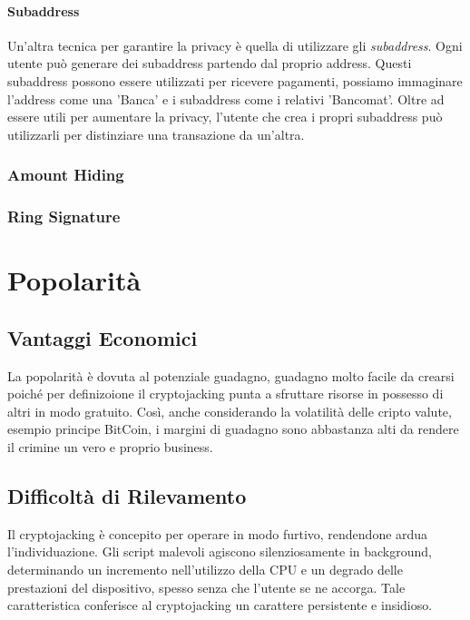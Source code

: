 \documentclass[12pt,a4paper]{article}
\begin{document}
\paragraph{Subaddress}
Un'altra tecnica per garantire la privacy è quella di utilizzare gli
\textit{subaddress}. Ogni utente può generare dei subaddress partendo dal
proprio address. Questi subaddress possono essere utilizzati per ricevere
pagamenti, possiamo immaginare l'address come una 'Banca' e i subaddress come i
relativi 'Bancomat'. Oltre ad essere utili per aumentare la privacy, l'utente
che crea i propri subaddress può utilizzarli per distinziare una transazione da
un'altra.

\subsubsection{Amount Hiding}

\subsubsection{Ring Signature}

\newpage 

\section{Popolarità}

\subsection{Vantaggi Economici}
La popolarità è dovuta al potenziale guadagno, guadagno molto facile da crearsi
poiché per definizoione il cryptojacking punta a sfruttare risorse in possesso
di altri in modo gratuito. Così, anche considerando la volatilità delle cripto
valute, esempio principe BitCoin, i margini di guadagno sono abbastanza alti da
rendere il crimine un vero e proprio business. 

\subsection{Difficoltà di Rilevamento}
Il cryptojacking è concepito per operare in modo furtivo, rendendone ardua
l'individuazione. Gli script malevoli agiscono silenziosamente in background,
determinando un incremento nell'utilizzo della CPU e un degrado delle
prestazioni del dispositivo, spesso senza che l'utente se ne accorga. Tale
caratteristica conferisce al cryptojacking un carattere persistente e insidioso.
\end{document}

